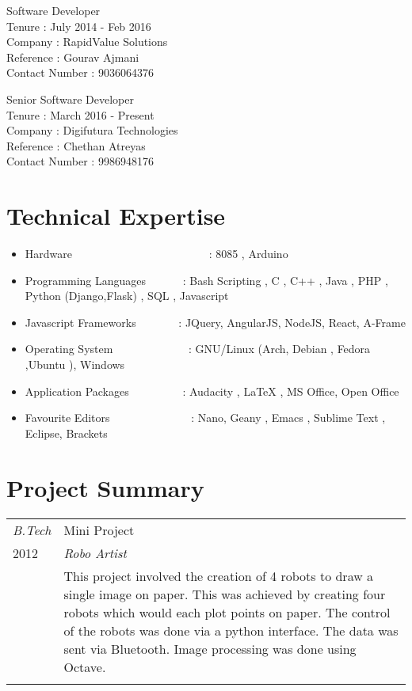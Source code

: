 \documentclass[a4paper]{article}
\begin{document}
\begin{CV}
\item Software Developer \\
Tenure : July 2014 - Feb 2016\\
Company : RapidValue Solutions\\
Reference : Gourav Ajmani \\
Contact Number : 9036064376 \\ 
\end{CV}

\begin{CV}
\item Senior Software Developer \\
Tenure : March 2016 - Present\\
Company : Digifutura Technologies\\
Reference : Chethan Atreyas \\
Contact Number : 9986948176 \\ 
\end{CV}


\section{Technical Expertise}
\begin{itemize}
\item Hardware \indent \ \ \ \ \ \  \  \ \ \ \ \ \ \ \ \ \ \ \ \ \ \ \ \ :  8085 , Arduino
\item Programming Languages \indent \ \ \ \ \ \ : Bash Scripting , C , C++ ,  Java ,  PHP , Python (Django,Flask)  , SQL , Javascript 
\item Javascript Frameworks \indent \ \ \ \ \ \ \ :  JQuery, AngularJS, NodeJS, React, A-Frame
\item Operating System \indent \ \ \ \ \ \ \  \ \ \ \ \ \ : GNU/Linux (Arch, Debian , Fedora ,Ubuntu ), Windows 
\item Application Packages \indent \ \ \ \ \ \ \  \ \ : Audacity , LaTeX ,  MS Office, Open Office
\item Favourite Editors \indent \ \ \ \ \ \ \ \ \ \ \ \ \ \ :  Nano, Geany , Emacs , Sublime Text , Eclipse, Brackets

\end{itemize}

\section{Project Summary}

\begin{tabular}{p{4cm}|p{13cm}}
\emph{B.Tech} & Mini Project \\
\textsc{2012} & \emph{Robo Artist} \\
& \normalsize{This project involved the creation of 4 robots to draw a single image on paper. This was achieved by creating four robots which would each plot points on paper. The control of the robots was done via a python interface. The data was sent via Bluetooth. Image processing was done using Octave. 
}
\\
\multicolumn{2}{c}{}
\end{tabular}
\end{document}
